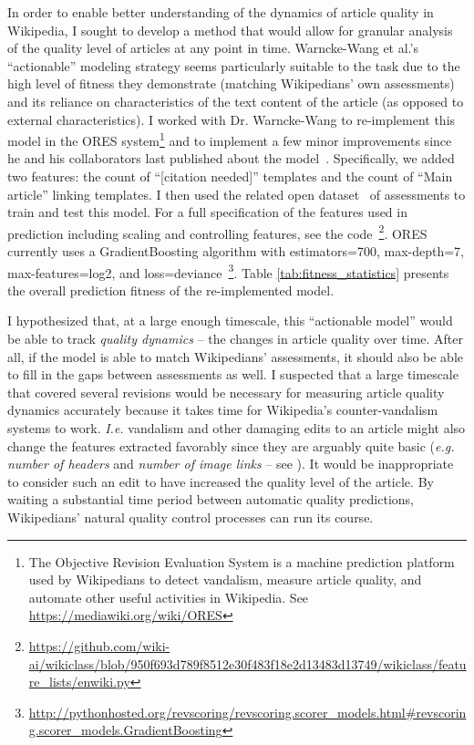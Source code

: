 
In order to enable better understanding of the dynamics of article quality in Wikipedia, I sought to develop a method that would allow for granular analysis of the quality level of articles at any point in time.  Warncke-Wang et al.'s ``actionable'' modeling strategy seems particularly suitable to the task due to the high level of fitness they demonstrate (matching Wikipedians' own assessments) and its reliance on characteristics of the text content of the article (as opposed to external characteristics).  I worked with Dr. Warncke-Wang to re-implement this model in the ORES system\footnote{The Objective Revision Evaluation System is a machine prediction platform used by Wikipedians to detect vandalism, measure article quality, and automate other useful activities in Wikipedia. See \url{https://mediawiki.org/wiki/ORES}} and to implement a few minor improvements since he and his collaborators last published about the model~\cite{wang15success}.  Specifically, we added two features: the count of ``[citation needed]'' templates and the count of ``Main article'' linking templates.  I then used the related open dataset~\cite{wang15english} of assessments to train and test this model.  For a full specification of the features used in prediction including scaling and controlling features, see the code~\footnote{\url{https://github.com/wiki-ai/wikiclass/blob/950f693d789f8512e30f483f18e2d13483d13749/wikiclass/feature_lists/enwiki.py}}.  ORES currently uses a GradientBoosting algorithm with estimators=700, max-depth=7, max-features=log2, and loss=deviance~\footnote{\url{http://pythonhosted.org/revscoring/revscoring.scorer_models.html\#revscoring.scorer_models.GradientBoosting}}.  Table \ref{tab:fitness_statistics} presents the overall prediction fitness of the re-implemented model.


 I hypothesized that, at a large enough timescale, this ``actionable model'' would be able to track \emph{quality dynamics} -- the changes in article quality over time.  After all, if the model is able to match Wikipedians' assessments, it should also be able to fill in the gaps between assessments as well.  I suspected that a large timescale that covered several revisions would be necessary for measuring article quality dynamics accurately because it takes time for Wikipedia's counter-vandalism systems to work.  \emph{I.e.} vandalism and other damaging edits to an article might also change the features extracted favorably since they are arguably quite basic (\emph{e.g.} \emph{number of headers} and \emph{number of image links} -- see \cite{wang13tell}).  It would be inappropriate to consider such an edit to have increased the quality level of the article.  By waiting a substantial time period between automatic quality predictions, Wikipedians' natural quality control processes can run its course.

